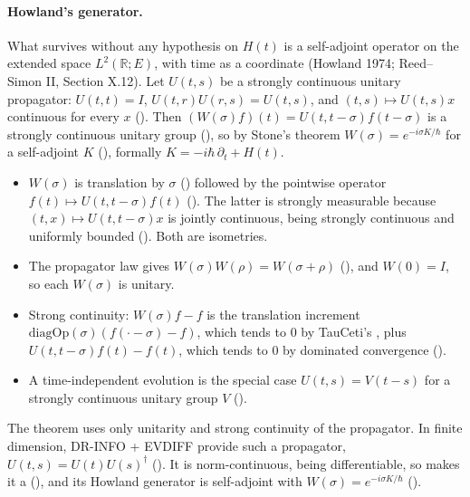 \documentclass[11pt]{article}
\begin{document}
\paragraph{Howland's generator.} What survives without any hypothesis on $H(t)$ is a
self-adjoint operator on the extended space $L^2(\mathbb{R};E)$, with time as a coordinate
(Howland 1974; Reed--Simon II, Section X.12). Let $U(t,s)$ be a strongly continuous unitary
propagator: $U(t,t) = I$, $U(t,r)U(r,s) = U(t,s)$, and $(t,s) \mapsto U(t,s)x$ continuous for
every $x$ (). Then $(W(\sigma)f)(t) = U(t,t-\sigma)f(t-\sigma)$ is a
strongly continuous unitary group (), so by Stone's theorem
$W(\sigma) = e^{-i\sigma K/\hbar}$ for a self-adjoint $K$
(), formally $K = -i\hbar\,\partial_t + H(t)$.
\begin{itemize}
\item $W(\sigma)$ is translation by $\sigma$ () followed by the pointwise operator
  $f(t) \mapsto U(t,t-\sigma)f(t)$ (). The latter is strongly
  measurable because $(t,x) \mapsto U(t,t-\sigma)x$ is jointly continuous, being strongly
  continuous and uniformly bounded (). Both are isometries.
\item The propagator law gives $W(\sigma)W(\rho) = W(\sigma+\rho)$
  (), and $W(0) = I$, so each $W(\sigma)$ is unitary.
\item Strong continuity: $W(\sigma)f - f$ is the translation increment
  $\mathrm{diagOp}(\sigma)(f(\cdot-\sigma) - f)$, which tends to $0$ by TauCeti's
  , plus
  $U(t,t-\sigma)f(t) - f(t)$, which tends to $0$ by dominated convergence
  ().
\item A time-independent evolution is the special case $U(t,s) = V(t-s)$ for a strongly
  continuous unitary group $V$ ().
\end{itemize}
The theorem uses only unitarity and strong continuity of the propagator. In finite dimension,
DR-INFO + EVDIFF provide such a propagator, $U(t,s) = U(t)U(s)^\dagger$
(). It is norm-continuous, being differentiable, so
 makes it a 
(), and its Howland generator is self-adjoint with
$W(\sigma) = e^{-i\sigma K/\hbar}$ ().
\end{document}
